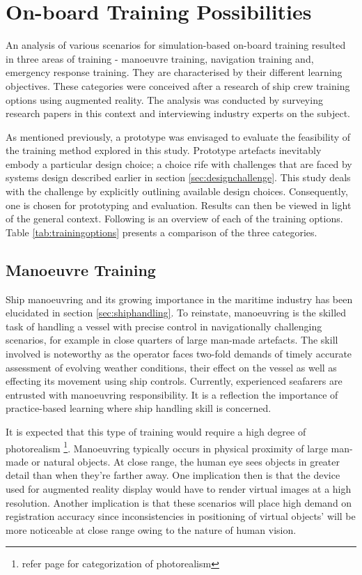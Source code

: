 \section{On-board Training Possibilities}
\label{sec:trainingcomparison}
An analysis of various scenarios for simulation-based on-board training resulted in three areas of training - manoeuvre training, navigation training and, emergency response training. They are characterised by their different learning objectives. These categories were conceived after a research of ship crew training options using augmented reality. The analysis was conducted by surveying research papers in this context and interviewing industry experts on the subject. 

As mentioned previously, a prototype was envisaged to evaluate the feasibility of the training method explored in this study. Prototype artefacts inevitably embody a particular design choice; a choice rife with challenges that are faced by systems design described earlier in section \ref{sec:designchallenge}. This study deals with the challenge by explicitly outlining available design choices. Consequently, one is chosen for prototyping and evaluation. Results can then be viewed in light of the general context. Following is an overview of each of the training options. Table \ref{tab:trainingoptions} presents a comparison of the three categories.

\subsection{Manoeuvre Training}

Ship manoeuvring and its growing importance in the maritime industry has been elucidated in section \ref{sec:shiphandling}. To reinstate, manoeuvring is the skilled task of handling a vessel with precise control in navigationally challenging scenarios, for example in close quarters of large man-made artefacts. The skill involved is noteworthy as the operator faces two-fold demands of timely accurate assessment of evolving weather conditions, their effect on the vessel as well as effecting its movement using ship controls. Currently, experienced seafarers are entrusted with manoeuvring responsibility. It is a reflection the importance of practice-based learning where ship handling skill is concerned.  

It is expected that this type of training would require a high degree of photorealism \footnote{refer page \pageref{sec:photorealism} for categorization of photorealism}. Manoeuvring typically occurs in physical proximity of large man-made or natural objects. At close range, the human eye sees objects in greater detail than when they're farther away. One implication then is that the device used for augmented reality display would have to render virtual images at a high resolution. Another implication is that these scenarios will place high demand on registration accuracy since inconsistencies in positioning of virtual objects' will be more noticeable at close range owing to the nature of human vision.

